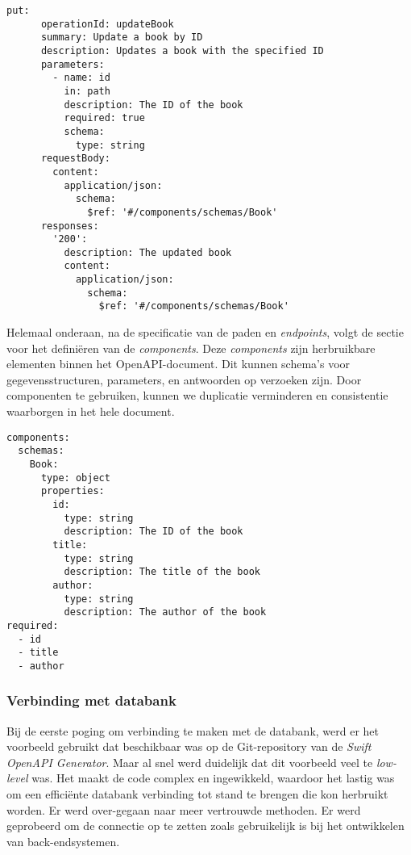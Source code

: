 \begin{itemize}
\begin{lstlisting}[caption=openapi.yml file]
    put:
      operationId: updateBook
      summary: Update a book by ID
      description: Updates a book with the specified ID
      parameters:
        - name: id
          in: path
          description: The ID of the book
          required: true
          schema:
            type: string
      requestBody:
        content:
          application/json:
            schema:
              $ref: '#/components/schemas/Book'
      responses:
        '200':
          description: The updated book
          content:
            application/json:
              schema:
                $ref: '#/components/schemas/Book'
\end{lstlisting}

\end{itemize}
Helemaal onderaan, na de specificatie van de paden en \textit{endpoints}, volgt de sectie voor het definiëren van de \textit{components}. Deze \textit{components} zijn herbruikbare elementen binnen het OpenAPI-document. Dit kunnen schema's voor gegevensstructuren, parameters, en antwoorden op verzoeken zijn. Door componenten te gebruiken, kunnen we duplicatie verminderen en consistentie waarborgen in het hele document.

\begin{lstlisting}[caption=openapi.yaml file]
components:
  schemas:
    Book:
      type: object
      properties:
        id:
          type: string
          description: The ID of the book
        title:
          type: string
          description: The title of the book
        author:
          type: string
          description: The author of the book
required:
  - id
  - title
  - author
\end{lstlisting}




\subsubsection{Verbinding met databank}

Bij de eerste poging om verbinding te maken met de databank, werd er het voorbeeld gebruikt dat beschikbaar was op de Git-repository van de \textit{Swift OpenAPI Generator}. Maar al snel werd duidelijk dat dit voorbeeld veel te \textit{low-level} was. Het maakt de code complex en ingewikkeld, waardoor het lastig was om een efficiënte databank verbinding tot stand te brengen die kon herbruikt worden.  
Er werd over-gegaan naar meer vertrouwde methoden. Er werd geprobeerd om de connectie op te zetten zoals gebruikelijk is bij het ontwikkelen van back-endsystemen.  \\ 

